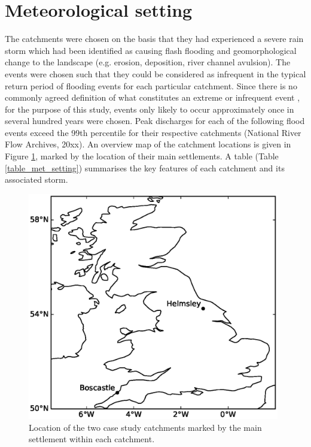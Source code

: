 \section{Meteorological setting}
The catchments were chosen on the basis that they had experienced a severe rain storm which had been identified as causing flash flooding and geomorphological change to the landscape (e.g. erosion, deposition, river channel avulsion). The events were chosen such that they could be considered as infrequent in the typical return period of flooding events for each particular catchment. Since there is no commonly agreed definition of what constitutes an extreme or infrequent event \citep[e.g.][]{wilby2008climate,fowler2010detecting,jones2014objective,}, for the purpose of this study, events only likely to occur approximately once in several hundred years were chosen. Peak discharges for each of the following flood events exceed the 99th percentile for their respective catchments (National River Flow Archives, 20xx).  An overview map of the catchment locations is given in Figure \ref{fig_location_map}, marked by the location of their main settlements. A table (Table \ref{table_met_setting}) summarises the key features of each catchment and its associated storm.

\begin{figure}[htb]
\includegraphics[width=11cm]{chp_events_figures_scripts/figure_location_map.eps}
\caption{Location of the two case study catchments marked by the main settlement within each catchment.}
\label{fig_location_map}
\end{figure}

